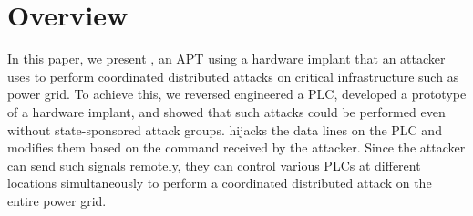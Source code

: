 \section{Overview}
\label{sec:implant-overview}





In this paper, we present \name, an APT using a hardware implant that an attacker uses to perform coordinated distributed attacks on critical infrastructure such as power grid. To achieve this, we reversed engineered a PLC, developed a prototype of a hardware implant, and showed that such attacks could be performed even without state-sponsored attack groups. \name hijacks the data lines on the PLC and modifies them based on the command received by the attacker. Since the attacker can send such signals remotely, they can control various PLCs at different locations simultaneously to perform a coordinated distributed attack on the entire power grid.

